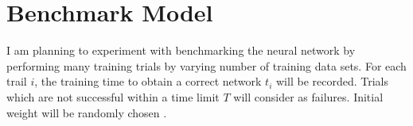 \chapter{Benchmark Model}

I am planning to experiment with benchmarking the neural network by performing many training trials by varying number of training data sets. For each trail $i$, the training time to obtain a correct network $t_i$ will be recorded. Trials which are not successful within a time limit $T$ will consider as failures. Initial weight will be randomly chosen \cite{hamey1991benchmarking}. 



